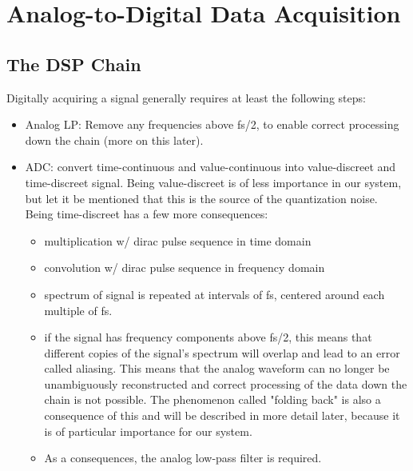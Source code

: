 \documentclass[a4paper,oneside]{alpenthesis/alpenthesis}
\begin{document}
\section{Analog-to-Digital Data Acquisition}
\label{sec:adc-acquisition}

\subsection{The DSP Chain}
\label{subsec:dsp-chain}

Digitally acquiring a signal generally requires at least the following steps:

\begin{itemize}\tightlist
    \item
        Analog LP: Remove any frequencies above fs/2, to enable correct processing
        down the chain (more on this later).
    \item
        ADC: convert time-continuous and value-continuous into value-discreet and
        time-discreet signal. Being value-discreet is of less importance in our
        system, but let it be mentioned that this is the source of the quantization
        noise. Being time-discreet has a few more consequences:
        \begin{itemize}\tightlist
                \item
                    multiplication w/ dirac pulse sequence in time domain
                \item
                    convolution w/ dirac pulse sequence in frequency domain
                \item
                    spectrum of signal is repeated at intervals of fs, centered
                    around each multiple of fs.
                \item
                    if the signal has frequency components above fs/2, this means
                    that different copies of the signal's spectrum will overlap
                    and lead to an error called aliasing. This means that the
                    analog waveform can no longer be unambiguously reconstructed
                    and correct processing of the data down the chain is not possible.
                    The phenomenon called "folding back" is also a consequence of
                    this and will be described in more detail later, because it is
                    of particular importance for our system.
                \item
                    As a consequences, the analog low-pass filter is required.

\end{itemize}
\end{itemize}
\end{document}
